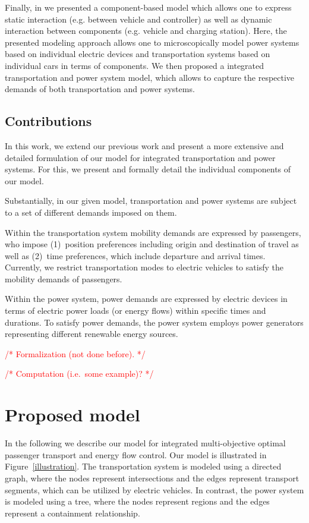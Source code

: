 \documentclass[conference]{IEEEtran}
\newcommand{\todo}[1]{\textcolor{red}{/* #1 */}}
\begin{document}
	Finally, in \cite{ascher2015integrated} we presented a component-based model which allows one to express static interaction (e.g. between vehicle and controller) as well as dynamic interaction between components (e.g. vehicle and charging station). Here, the presented modeling approach allows one to microscopically model power systems based on individual electric devices and transportation systems based on individual cars in terms of components. We then proposed a integrated transportation and power system model, which allows to capture the respective demands of both transportation and power systems.
	
	\subsection{Contributions}
	\label{contributions}
	
	In this work, we extend our previous work and present a more extensive and detailed formulation of our model for integrated transportation and power systems. For this, we present and formally detail the individual components of our model.
	
	Substantially, in our given model, transportation and power systems are subject to a set of different demands imposed on them. 
	
	Within the transportation system mobility demands are expressed by passengers, who impose (1)~position preferences including origin and destination of travel as well as (2)~time preferences, which include departure and arrival times. Currently, we restrict transportation modes to electric vehicles to satisfy the mobility demands of passengers.
	
	Within the power system, power demands are expressed by electric devices in terms of electric power loads (or energy flows) within specific times and durations. To satisfy power demands, the power system employs power generators representing different renewable energy sources.
	
	\todo{Formalization (not done before).}
	
	\todo{Computation (i.e.\ some example)?}
	
	\section{Proposed model}
	\label{proposed_model}
	
	In the following we describe our model for integrated multi-objective optimal passenger transport and energy flow control. Our model is illustrated in Figure~\ref{illustration}. The transportation system is modeled using a directed graph, where the nodes represent intersections and the edges represent transport segments, which can be utilized by electric vehicles. In contrast, the power system is modeled using a tree, where the nodes represent regions and the edges represent a containment relationship.
	
\end{document}
